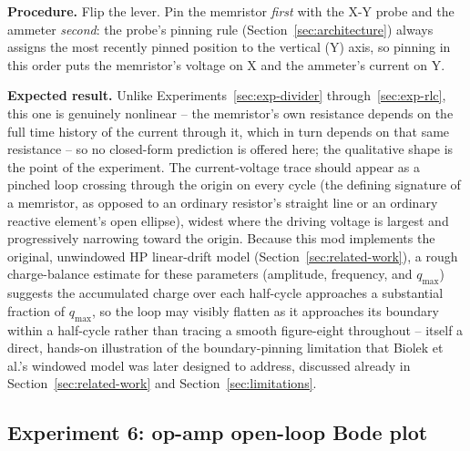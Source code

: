 \textbf{Procedure.} Flip the lever. Pin the memristor \emph{first} with the X-Y probe and
the ammeter \emph{second}: the probe's pinning rule (Section~\ref{sec:architecture}) always
assigns the most recently pinned position to the vertical (Y) axis, so pinning in this order
puts the memristor's voltage on X and the ammeter's current on Y.

\textbf{Expected result.} Unlike Experiments~\ref{sec:exp-divider}
through~\ref{sec:exp-rlc}, this one is genuinely nonlinear -- the memristor's own resistance
depends on the full time history of the current through it, which in turn depends on that
same resistance -- so no closed-form prediction is offered here; the qualitative shape is the
point of the experiment. The current-voltage trace should appear as a pinched loop crossing
through the origin on every cycle (the defining signature of a memristor, as opposed to an
ordinary resistor's straight line or an ordinary reactive element's open ellipse), widest
where the driving voltage is largest and progressively narrowing toward the origin. Because
this mod implements the original, unwindowed HP linear-drift model
(Section~\ref{sec:related-work}), a rough charge-balance estimate for these parameters
(amplitude, frequency, and $q_{\max}$) suggests the accumulated charge over each half-cycle
approaches a substantial fraction of $q_{\max}$, so the loop may visibly flatten as it
approaches its boundary within a half-cycle rather than tracing a smooth figure-eight
throughout -- itself a direct, hands-on illustration of the boundary-pinning limitation that
Biolek et al.'s windowed model was later designed to address, discussed already in
Section~\ref{sec:related-work} and Section~\ref{sec:limitations}.

\subsection{Experiment 6: op-amp open-loop Bode plot}
\label{sec:exp-opamp}

